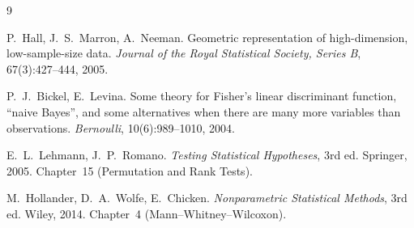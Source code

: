 \documentclass[11pt]{article}
\newcommand{\1}{\mathbf{1}}
\begin{document}
\begin{thebibliography}{9}

P.~Hall, J.~S.~Marron, A.~Neeman.
\newblock Geometric representation of high-dimension, low-sample-size data.
\newblock \emph{Journal of the Royal Statistical Society, Series B},
67(3):427--444, 2005.

P.~J.~Bickel, E.~Levina.
\newblock Some theory for Fisher's linear discriminant function,
``naive Bayes'', and some alternatives when there are many more
variables than observations.
\newblock \emph{Bernoulli}, 10(6):989--1010, 2004.

E.~L.~Lehmann, J.~P.~Romano.
\newblock \emph{Testing Statistical Hypotheses}, 3rd ed.
\newblock Springer, 2005. Chapter~15 (Permutation and Rank Tests).

M.~Hollander, D.~A.~Wolfe, E.~Chicken.
\newblock \emph{Nonparametric Statistical Methods}, 3rd ed.
\newblock Wiley, 2014. Chapter~4 (Mann--Whitney--Wilcoxon).

\end{thebibliography}
\end{document}
